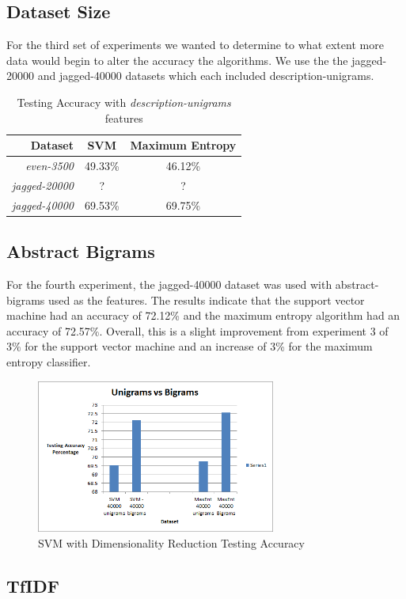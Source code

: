 \subsection{Dataset Size}
For the third set of experiments we wanted to determine to what extent more data would begin to alter the accuracy the algorithms.  We use the the jagged-20000 and jagged-40000 datasets which each included description-unigrams.

\begin{table}[Ht]
\caption{Testing Accuracy with \emph{description-unigrams} features}
\centering
\begin{tabular}{| r | c | c |}
\hline
Dataset & SVM & Maximum Entropy \\ \hline
\emph{even-3500} & 49.33\% & 46.12\% \\ \hline
\emph{jagged-20000} & ? & ? \\ \hline
\emph{jagged-40000} & 69.53\% & 69.75\% \\ \hline
\end{tabular}
\end{table}

\subsection{Abstract Bigrams}
For the fourth experiment, the jagged-40000 dataset was used with abstract-bigrams used as the features.  The results indicate that the support vector machine had an accuracy of 72.12\% and the maximum entropy algorithm had an accuracy of 72.57\%.  Overall, this is a slight improvement from experiment 3 of 3\% for the support vector machine and an increase of 3\% for the maximum entropy classifier.

\begin{figure}[!h]
\begin{center}
\caption{SVM with Dimensionality Reduction Testing Accuracy}
\includegraphics[width=0.7\textwidth]{Unigrams_vs_Bigrams.png}
\end{center}
\end{figure}


\subsection{TfIDF}


